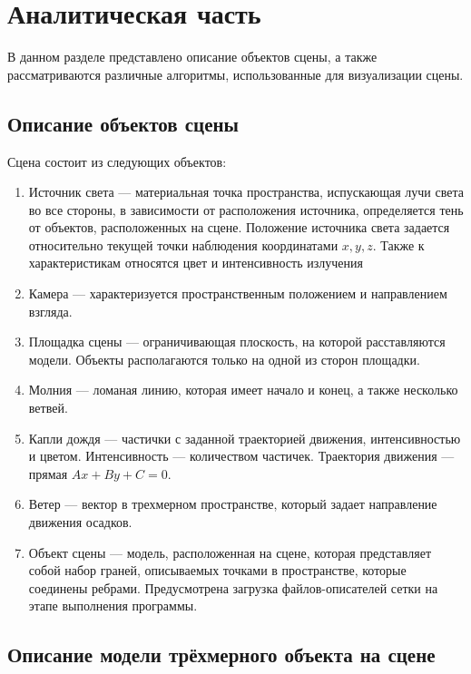 	
\chapter{Аналитическая часть}

В данном разделе представлено описание объектов сцены, а также рассматриваются различные алгоритмы, использованные для визуализации сцены.

\section{Описание объектов сцены}

Сцена состоит из следующих объектов:
\begin{enumerate}[label=\arabic*)]
	\item Источник света --- материальная точка пространства, испускающая лучи света во все стороны, в зависимости от расположения
	источника, определяется
	тень от объектов, расположенных на сцене. Положение источника света
	задается относительно текущей точки наблюдения координатами $x, y, z$. Также к характеристикам относятся цвет и интенсивность излучения
	\item Камера --- характеризуется пространственным положением и направлением взгляда.
	\item Площадка сцены --- ограничивающая плоскость,
	на которой расставляются модели. Объекты располагаются только на
	одной из сторон площадки.
	\item Молния --- ломаная линию, которая имеет начало и
	конец, а также несколько ветвей.
	\item Капли дождя --- частички с заданной траекторией движения, интенсивностью и цветом. Интенсивность --- количеством частичек.
	Траектория движения --- прямая ${Ax + By + C = 0}$.
	\item Ветер --- вектор в трехмерном пространстве, который задает направление движения осадков. 
	\item Объект сцены --- модель, расположенная на сцене, которая представляет собой набор граней, описываемых точками в пространстве, которые соединены ребрами. Предусмотрена загрузка файлов-описателей сетки на этапе выполнения программы.
\end{enumerate} 


\section{Описание модели трёхмерного объекта на сцене}

